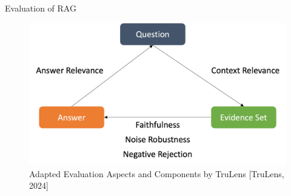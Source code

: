 \documentclass{beamer}
\begin{document}
\begin{frame}{Evaluation of RAG}
    
  \begin{figure}
    \includegraphics[width=\textwidth]{Grafiken/Evaluation_Dimensions_RAGAS_Turelens.png} 
    \caption{Adapted Evaluation Aspects and Components by TruLens [TruLens, 2024]}
  \end{figure}
  
\end{frame}
\end{document}
